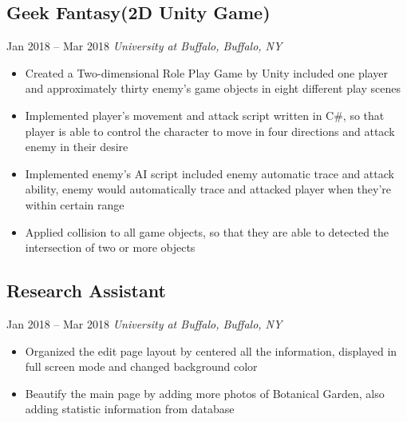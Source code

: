 \documentclass[11pt, letterpaper]{article} %
\begin{document}
\subsection{Geek Fantasy(2D Unity Game)}
\hspace*{\fill}Jan 2018 -- Mar 2018
\linebreak
\vspace{-0.7em}
\textit{University at Buffalo, Buffalo, NY}
\begin{itemize}
	\setlength\itemsep{-0.5em}
	\item Created a Two-dimensional Role Play Game by Unity included one player and approximately thirty enemy's game objects in eight different play scenes
	\item Implemented player's movement and attack script written in C\#, so that player is able to control the character to move in four directions and attack enemy in their desire
	\item Implemented enemy's AI script included enemy automatic trace and attack ability, enemy would automatically trace and attacked player when they're within certain range
	\item Applied collision to all game objects, so that they are able to detected the intersection of two or more objects
\end{itemize}
\vspace{-0.5em}

\subsection{Research Assistant }
\hspace*{\fill}Jan 2018 -- Mar 2018
\linebreak
\vspace{-0.7em}
\textit{University at Buffalo, Buffalo, NY}
\begin{itemize}
	\setlength\itemsep{-0.5em}
	\item Organized the edit page layout by centered all the information, displayed in full screen mode and changed background color
	\item Beautify the main page by adding more photos of Botanical Garden, also adding statistic information from database

\end{itemize}
\end{document}
